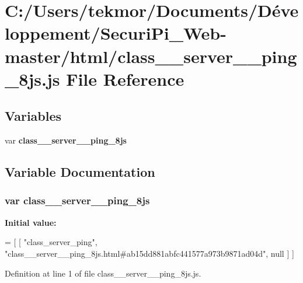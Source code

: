 \section{C\+:/\+Users/tekmor/\+Documents/\+Développement/\+Securi\+Pi\+\_\+\+Web-\/master/html/class\+\_\+\+\_\+server\+\_\+\+\_\+ping\+\_\+8js.js File Reference}
\label{class____server____ping__8js_8js}
\subsection*{Variables}
\begin{DoxyCompactItemize}
\item 
var {\bf class\+\_\+\+\_\+server\+\_\+\+\_\+ping\+\_\+8js}
\end{DoxyCompactItemize}


\subsection{Variable Documentation}
\subsubsection[{class\+\_\+\+\_\+server\+\_\+\+\_\+ping\+\_\+8js}]{\setlength{\rightskip}{0pt plus 5cm}var class\+\_\+\+\_\+server\+\_\+\+\_\+ping\+\_\+8js}\label{class____server____ping__8js_8js_ada6df63eda47993d0b13788a13e72953}
{\bfseries Initial value\+:}
\begin{DoxyCode}
=
[
    [ \textcolor{stringliteral}{"class\_server\_ping"}, \textcolor{stringliteral}{"class\_\_server\_\_ping\_8js.html#ab15dd881abfc441577a973b9871ad04d"}, null ]
]
\end{DoxyCode}


Definition at line 1 of file class\+\_\+\+\_\+server\+\_\+\+\_\+ping\+\_\+8js.\+js.

